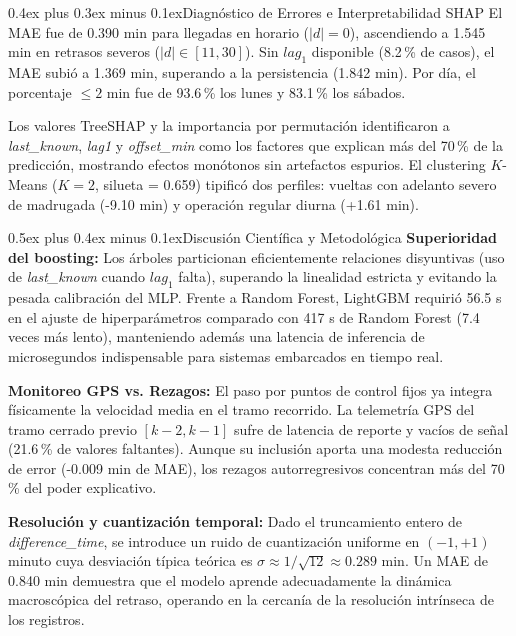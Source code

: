 \documentclass[conference]{IEEEtran}
\makeatletter
\def\section{\@startsection{section}{1}{\z@}{1.3ex plus 0.8ex minus 0.2ex}%
{0.5ex plus 0.4ex minus 0.1ex}{\normalfont\normalsize\bfseries\scshape\centering}}
\def\subsection{\@startsection{subsection}{2}{\z@}{1.0ex plus 0.6ex minus 0.2ex}%
{0.4ex plus 0.3ex minus 0.1ex}{\normalfont\normalsize\bfseries\itshape}}
\makeatother
\begin{document}
\subsection{Diagnóstico de Errores e Interpretabilidad SHAP}
El MAE fue de 0.390 min para llegadas en horario ($|d|=0$), ascendiendo a 1.545 min en retrasos severos ($|d| \in [11, 30]$). Sin $lag_1$ disponible (8.2\,\% de casos), el MAE subió a 1.369 min, superando a la persistencia (1.842 min). Por día, el porcentaje $\le 2$ min fue de 93.6\,\% los lunes y 83.1\,\% los sábados.

Los valores TreeSHAP y la importancia por permutación identificaron a \textit{last\_known}, \textit{lag1} y \textit{offset\_min} como los factores que explican más del 70\,\% de la predicción, mostrando efectos monótonos sin artefactos espurios. El clustering $K$-Means ($K=2$, silueta = 0.659) tipificó dos perfiles: vueltas con adelanto severo de madrugada (-9.10 min) y operación regular diurna (+1.61 min).

\section{Discusión Científica y Metodológica}
\textbf{Superioridad del boosting:} Los árboles particionan eficientemente relaciones disyuntivas (uso de \textit{last\_known} cuando $lag_1$ falta), superando la linealidad estricta y evitando la pesada calibración del MLP. Frente a Random Forest, LightGBM requirió 56.5 s en el ajuste de hiperparámetros comparado con 417 s de Random Forest (7.4 veces más lento), manteniendo además una latencia de inferencia de microsegundos indispensable para sistemas embarcados en tiempo real.

\textbf{Monitoreo GPS vs. Rezagos:} El paso por puntos de control fijos ya integra físicamente la velocidad media en el tramo recorrido. La telemetría GPS del tramo cerrado previo $[k-2, k-1]$ sufre de latencia de reporte y vacíos de señal (21.6\,\% de valores faltantes). Aunque su inclusión aporta una modesta reducción de error (-0.009 min de MAE), los rezagos autorregresivos concentran más del 70\,\% del poder explicativo.

\textbf{Resolución y cuantización temporal:} Dado el truncamiento entero de \textit{difference\_time}, se introduce un ruido de cuantización uniforme en $(-1, +1)$ minuto cuya desviación típica teórica es $\sigma \approx 1/\sqrt{12} \approx 0.289$ min. Un MAE de 0.840 min demuestra que el modelo aprende adecuadamente la dinámica macroscópica del retraso, operando en la cercanía de la resolución intrínseca de los registros.
\end{document}
